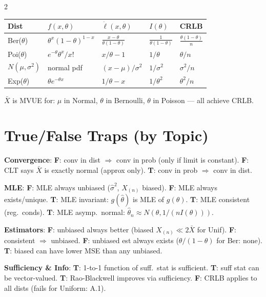 \documentclass[8pt]{extarticle}
\begin{document}
\begin{multicols}{2}
\begin{tabular}{@{}lllll@{}}
\toprule
\textbf{Dist} & $f(x,\theta)$ & $\dot\ell(x,\theta)$ & $I(\theta)$ & \textbf{CRLB} \\
\midrule
Ber($\theta$) & $\theta^x(1{-}\theta)^{1-x}$ & $\frac{x-\theta}{\theta(1-\theta)}$ & $\frac{1}{\theta(1-\theta)}$ & $\frac{\theta(1-\theta)}{n}$ \\[4pt]
Poi($\theta$) & $e^{-\theta}\theta^x/x!$ & $x/\theta - 1$ & $1/\theta$ & $\theta/n$ \\[4pt]
$N(\mu,\sigma^2)$ & normal pdf & $(x{-}\mu)/\sigma^2$ & $1/\sigma^2$ & $\sigma^2/n$ \\[4pt]
Exp($\theta$) & $\theta e^{-\theta x}$ & $1/\theta - x$ & $1/\theta^2$ & $\theta^2/n$ \\
\bottomrule
\end{tabular}

\medskip

$\bar X$ is MVUE for: $\mu$ in Normal, $\theta$ in Bernoulli, $\theta$ in Poisson --- all achieve CRLB.

\section{True/False Traps (by Topic)}

\textbf{Convergence}:
\textbf{F}: conv in dist $\Rightarrow$ conv in prob (only if limit is constant). \;
\textbf{F}: CLT says $\bar X$ is exactly normal (approx only). \;
\textbf{T}: conv in prob $\Rightarrow$ conv in dist.

\textbf{MLE}:
\textbf{F}: MLE always unbiased ($\hat\sigma^2$, $X_{(n)}$ biased). \;
\textbf{F}: MLE always exists/unique. \;
\textbf{T}: MLE invariant: $g(\hat\theta)$ is MLE of $g(\theta)$. \;
\textbf{T}: MLE consistent (reg.\ conds). \;
\textbf{T}: MLE asymp.\ normal: $\hat\theta_n \approx N(\theta, 1/(nI(\theta)))$.

\textbf{Estimators}:
\textbf{F}: unbiased always better (biased $X_{(n)} \ll 2\bar X$ for Unif). \;
\textbf{F}: consistent $\Rightarrow$ unbiased. \;
\textbf{F}: unbiased est always exists ($\theta/(1{-}\theta)$ for Ber: none). \;
\textbf{T}: biased can have lower MSE than any unbiased.

\textbf{Sufficiency \& Info}:
\textbf{T}: 1-to-1 function of suff.\ stat is sufficient. \;
\textbf{T}: suff stat can be vector-valued. \;
\textbf{T}: Rao-Blackwell improves via sufficiency. \;
\textbf{F}: CRLB applies to all dists (fails for Uniform: A.1).


\end{multicols}
\end{document}
